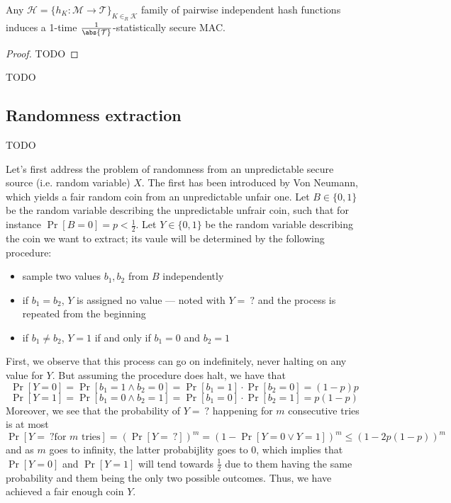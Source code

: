 \documentclass[a4paper, 12pt]{report}
\begin{document}
\begin{framedthm}{}
	Any $\mathcal H = \{h_K : \mathcal M \to \mathcal T\}_{K \in_R \mathcal K}$ family of pairwise independent hash functions induces a 1-time $\tfrac{1}{\abs {\mathcal T}}$-statistically secure MAC.
\end{framedthm}

\begin{proof}
	TODO 
\end{proof}

TODO 

\subsection{Randomness extraction}

TODO 

Let's first address the problem of  randomness from an unpredictable secure source (i.e. random variable) $X$. The first  has been introduced by Von Neumann, which yields a fair random coin from an unpredictable unfair one. Let $B \in \{0, 1\}$ be the random variable describing the unpredictable unfrair coin, such that for instance $\Pr[B = 0] = p < \tfrac{1}{2}$. Let $Y \in \{0, 1\}$ be the random variable describing the coin we want to extract; its vaule will be determined by the following procedure:

\begin{itemize}
	\item sample two values $b_1, b_2$ from $B$ independently
	\item if $b_1 = b_2$, $Y$ is assigned no value --- noted with $Y = \ ?$ and the process is repeated from the beginning
	\item if $b_1 \neq b_2$, $Y = 1$ if and only if $b_1 = 0$ and $b_2 = 1$
\end{itemize}

First, we observe that this process can go on indefinitely, never halting on any value for $Y$. But assuming the procedure does halt, we have that $$\Pr[Y = 0] = \Pr[b_1 = 1 \land b_2 = 0] = \Pr[b_1 = 1] \cdot \Pr[b_2 = 0] = (1 - p)p$$ $$\Pr[Y = 1] = \Pr[b_1 = 0 \land b_2 = 1] = \Pr[b_1 = 0] \cdot \Pr[b_2 = 1] = p(1 - p)$$ Moreover, we see that the probability of $Y = \ ?$ happening for $m$ consecutive tries is at most $$\Pr[Y = \ ? \mbox{for $m$ tries}] = (\Pr[Y = \ ?])^m = (1 - \Pr[Y = 0 \lor Y = 1])^m \le (1 - 2p(1 - p))^m$$ and as $m$ goes to infinity, the latter probabijlity goes to 0, which implies that $\Pr[Y = 0]$ and $\Pr[Y = 1]$ will tend towards $\tfrac{1}{2}$ due to them having the same probability and them being the only two possible outcomes. Thus, we have achieved a fair enough coin $Y$.
\end{document}
